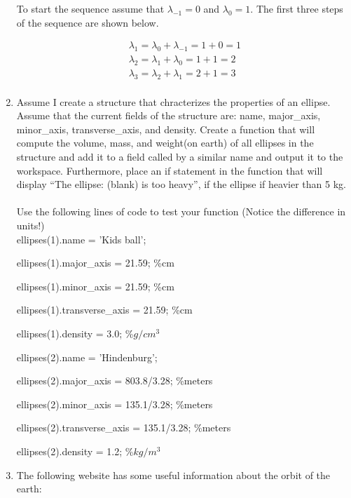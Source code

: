 \begin{enumerate}
To start the sequence assume that $\lambda_{-1} = 0$ and $\lambda_{0}
= 1$. The first three steps of the sequence are shown below.

\begin{equation}
\begin{matrix}
\lambda_{1} = \lambda_{0} + \lambda_{-1} = 1 + 0 = 1 \\
\lambda_{2} = \lambda_{1} + \lambda_{0} = 1 + 1 = 2 \\
\lambda_{3} = \lambda_{2} + \lambda_{1} = 2 + 1 = 3 \\
\end{matrix}
\end{equation}

\item Assume I create a structure that chracterizes the properties of an
ellipse. Assume that the current fields of the structure are:
name, major\_axis, minor\_axis, transverse\_axis, and density. Create a function that will
compute the volume, mass, and weight(on earth) of all ellipses in the
structure and add it to a field called by a similar name and output it to the
workspace. Furthermore, place an if statement in the function that
will display ``The ellipse: (blank) is too heavy'', if the ellipse if
heavier than 5 kg.
\ \\

\noindent Use the following lines of code to test your function (Notice the
difference in units!)
\ \\

ellipses(1).name = 'Kids ball';

ellipses(1).major\_axis = 21.59; \%cm

ellipses(1).minor\_axis = 21.59; \%cm

ellipses(1).transverse\_axis = 21.59; \%cm

ellipses(1).density = 3.0; \%$g/cm^3$

ellipses(2).name = 'Hindenburg'; 

ellipses(2).major\_axis = 803.8/3.28; \%meters

ellipses(2).minor\_axis = 135.1/3.28; \%meters

ellipses(2).transverse\_axis = 135.1/3.28; \%meters

ellipses(2).density = 1.2; \%$kg/m^3$
\ \\

\item The following website has some useful information about the
orbit of the earth:
\ \\


\end{enumerate}

